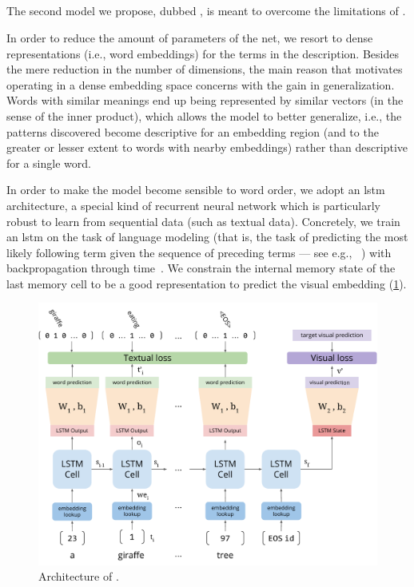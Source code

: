 \subsection{\densettv{}}
\label{subsec:t2v:dense-t2v}

The second model we propose, dubbed \densettv{}, is meant to overcome the limitations of \sparsettv{}.

In order to reduce the amount of parameters of the net, we resort to dense representations (i.e.,  word embeddings) for the terms in the description.
Besides the mere reduction in the number of dimensions, the main reason that motivates operating in a dense embedding space concerns with the gain in generalization.
Words with similar meanings end up being represented by similar vectors (in the sense of the inner product), which allows the model to better generalize, i.e.,  the patterns discovered become descriptive for an embedding region (and to the greater or lesser extent to words with nearby embeddings) rather than descriptive for a single word.

In order to make the model become sensible to word order, we adopt an \acrfull{lstm}~\cite{hochreiter1997long} architecture, a special kind of recurrent neural network which is particularly robust to learn from sequential data (such as textual data).
Concretely, we train an \gls{lstm} on the task of language modeling (that is, the task of predicting the most likely following term given the sequence of preceding terms --- see e.g., ~\cite{sundermeyer2012lstm}) with backpropagation through time~\cite{werbos1990backpropagation}.
We constrain the internal memory state of the last memory cell to be a good representation to predict the visual embedding (\ref{fig:t2v:d-t2v-arch}).

\begin{figure}
\includegraphics[width=\linewidth]{d-t2v-arch}
\caption{Architecture of \densettv{}.}
\label{fig:t2v:d-t2v-arch}
\end{figure}

